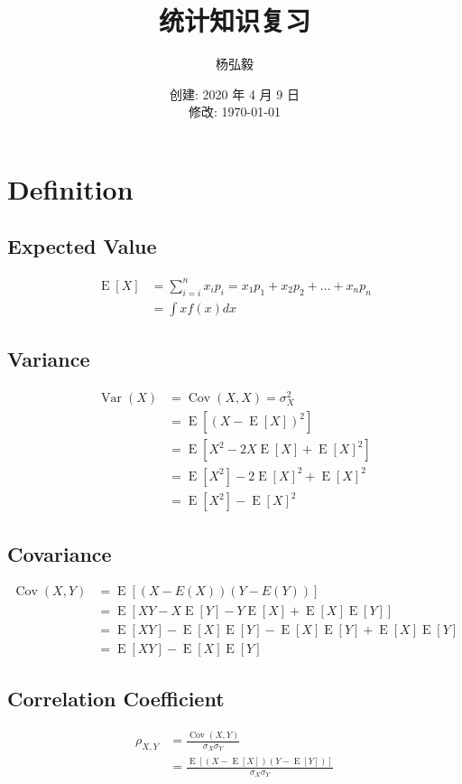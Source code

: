 \documentclass[11pt]{article}
\title{统计知识复习}
\author{杨弘毅}
\date{创建: 2020 年 4 月 9 日 \\修改: \today}
\newcommand{\E}{\operatorname{E}}
\newcommand{\Cov}{\operatorname{Cov}}
\newcommand{\Var}{\operatorname{Var}}
\begin{document}
\maketitle

\section{Definition}

\subsection*{Expected Value}
\noindent
\begin{align*}
    \E[X] &= \sum_{i=i}^n x_i p_i =x_1 p_1 + x_2 p_2 + \dots + x_n p_n \\
    &= \int x f(x) dx
\end{align*}

\subsection*{Variance}
\noindent
\begin{align*}
\Var(X) &= \Cov(X,X) = \sigma_X^2\\ 
&= \E[(X-\E[X])^2] \\
&= \E[X^2 - 2X\E[X] + \E[X]^2] \\
&= \E[X^2] - 2\E[X]^2 + \E[X]^2 \\
&= \E[X^2] - \E[X]^2
\end{align*}

\subsection*{Covariance}
\noindent
\begin{align*}
\Cov(X,Y) &= \E[(X-E(X))(Y-E(Y))] \\
&= \E[XY - X\E[Y] -Y\E[X]+ \E[X]\E[Y]] \\
&= \E[XY] - \E[X]\E[Y] - \E[X]\E[Y] + \E[X]\E[Y] \\
&= \E[XY] - \E[X]\E[Y]
\end{align*}

\subsection*{Correlation Coefficient}
\noindent
\begin{align*}
\rho_{X,Y} &= \frac{\Cov(X,Y)}{\sigma_X\sigma_Y} \\
&= \frac{\E[(X-\E[X])(Y-\E[Y])]}{\sigma_X\sigma_Y}
\end{align*}
\end{document}
